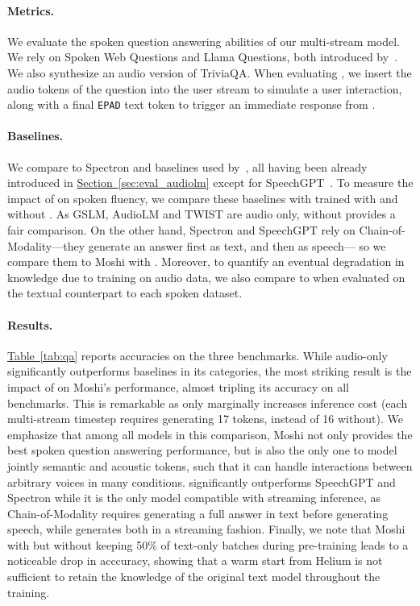 \paragraph{Metrics.} 
We evaluate the spoken question answering abilities of our multi-stream \ours{} model. We rely on Spoken Web Questions and Llama Questions, both introduced by~\citet{spectron}. We also synthesize an audio version of TriviaQA. When evaluating \ours{}, we insert the audio tokens of the question into the user stream to simulate a user interaction, along with a final \texttt{EPAD} text token to trigger an immediate response from \ours{}. 

\paragraph{Baselines.} 
We compare to Spectron and baselines used by~\citet{spectron}, all having been already introduced in \hyperref[sec:eval_audiolm]{Section~\ref{sec:eval_audiolm}} except for SpeechGPT~\citep{zhang2024speechgpt}. To measure the impact of \interleaving{} on spoken fluency, we compare these baselines with \ours{}  trained with and without \interleaving{}. As GSLM, AudioLM and TWIST are audio only, \ours{} without \interleaving{} provides a fair comparison. On the other hand, Spectron and SpeechGPT rely on Chain-of-Modality---they generate an answer first as text, and then as speech--- so we compare them to Moshi with \interleaving{}. Moreover, to quantify an eventual degradation in knowledge due to training on audio data, we also compare to \helium{} when evaluated on the textual counterpart to each spoken dataset.
\paragraph{Results.} \hyperref[tab:qa]{Table~\ref{tab:qa}} reports accuracies on the three benchmarks. While audio-only \ours{} significantly outperforms baselines in its categories, the most striking result is the impact of \interleaving{} on Moshi's performance, almost tripling its accuracy on all benchmarks. This is remarkable as \interleaving{} only marginally increases inference cost (each multi-stream timestep requires generating 17 tokens, instead of 16 without). We emphasize that among all models in this comparison, Moshi not only provides the best spoken question answering performance, but is also the only one to model jointly semantic and acoustic tokens, such that it can handle interactions between arbitrary voices in many conditions. \ours{} significantly outperforms SpeechGPT and Spectron while it is the only model compatible with streaming inference, as Chain-of-Modality requires generating a full answer in text before generating speech, while \interleaving{} generates both in a streaming fashion.
Finally, we note that Moshi with \interleaving{} but without keeping 50\% of text-only batches during pre-training leads to a noticeable drop in acccuracy, showing that a warm start from Helium is not sufficient to retain the knowledge of the original text model throughout the training.

